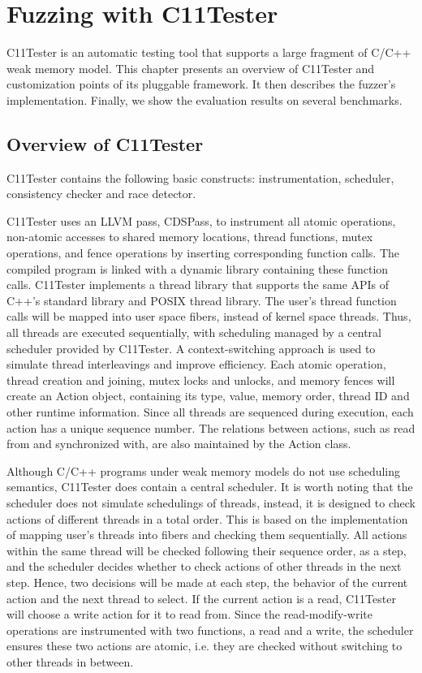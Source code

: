 \chapter{\label{cha:c11tester}Fuzzing with C11Tester}

C11Tester is an automatic testing tool that supports a large fragment of C/C++ weak memory model. This chapter presents an overview of C11Tester and customization points of its pluggable framework. It then describes the fuzzer's implementation. Finally, we show the evaluation results on several benchmarks.

\section{Overview of C11Tester}

C11Tester contains the following basic constructs: instrumentation, scheduler, consistency checker and race detector.

C11Tester uses an LLVM pass, CDSPass, to instrument all atomic operations, non-atomic accesses to shared memory locations, thread functions, mutex operations, and fence operations by inserting corresponding function calls. The compiled program is linked with a dynamic library containing these function calls.
C11Tester implements a thread library that supports the same APIs of C++'s standard library and POSIX thread library. The user's thread function calls will be mapped into user space fibers, instead of kernel space threads. Thus, all threads are executed sequentially, with scheduling managed by a central scheduler provided by C11Tester. A context-switching approach is used to simulate thread interleavings and improve efficiency.
Each atomic operation, thread creation and joining, mutex locks and unlocks, and memory fences will create an Action object, containing its type, value, memory order, thread ID and other runtime information. Since all threads are sequenced during execution, each action has a unique sequence number. The relations between actions, such as read from and synchronized with, are also maintained by the Action class.

Although C/C++ programs under weak memory models do not use scheduling semantics, C11Tester does contain a central scheduler. It is worth noting that the scheduler does not simulate schedulings of threads, instead, it is designed to check actions of different threads in a total order. This is based on the implementation of mapping user's threads into fibers and checking them sequentially. All actions within the same thread will be checked following their sequence order, as a step, and the scheduler decides whether to check actions of other threads in the next step. Hence, two decisions will be made at each step, the behavior of the current action and the next thread to select. If the current action is a read, C11Tester will choose a write action for it to read from. Since the read-modify-write operations are instrumented with two functions, a read and a write, the scheduler ensures these two actions are atomic, i.e.  they are checked without switching to other threads in between.

